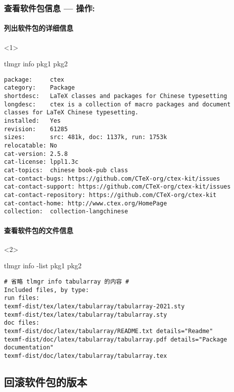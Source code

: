 \begin{frame}[fragile]
  \frametitle{查看软件包信息 --- 操作: }
  \framesubtitle<1>{列出软件包的详细信息}

  \begin{onlyenv}<1>
\begin{cmdcode}
tlmgr info pkg1 pkg2
\end{cmdcode}
\begin{lstlisting}[basicstyle=\tiny\ttfamily,frame=single]
package:     ctex
category:    Package
shortdesc:   LaTeX classes and packages for Chinese typesetting
longdesc:    ctex is a collection of macro packages and document classes for LaTeX Chinese typesetting.
installed:   Yes
revision:    61285
sizes:       src: 481k, doc: 1137k, run: 1753k
relocatable: No
cat-version: 2.5.8
cat-license: lppl1.3c
cat-topics:  chinese book-pub class
cat-contact-bugs: https://github.com/CTeX-org/ctex-kit/issues
cat-contact-support: https://github.com/CTeX-org/ctex-kit/issues
cat-contact-repository: https://github.com/CTeX-org/ctex-kit
cat-contact-home: http://www.ctex.org/HomePage
collection:  collection-langchinese
\end{lstlisting}
  \end{onlyenv}

  \framesubtitle<2>{查看软件包的文件信息}
  \begin{onlyenv}<2>
\begin{cmdcode}
tlmgr info -list pkg1 pkg2
\end{cmdcode}
\begin{lstlisting}[basicstyle=\tiny\ttfamily,frame=single]
# 省略 tlmgr info tabularray 的内容 #
Included files, by type:
run files:
texmf-dist/tex/latex/tabularray/tabularray-2021.sty
texmf-dist/tex/latex/tabularray/tabularray.sty
doc files:
texmf-dist/doc/latex/tabularray/README.txt details="Readme"
texmf-dist/doc/latex/tabularray/tabularray.pdf details="Package documentation"
texmf-dist/doc/latex/tabularray/tabularray.tex  
\end{lstlisting}
  \end{onlyenv}
\end{frame}

\subsection{回滚软件包的版本}

